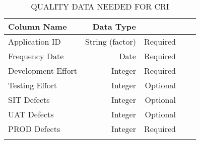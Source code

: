 \documentclass[SDSUThesis.tex]{subfiles}
\begin{document}
                \begin{longtable}{@{}l rr rr}
                    
                    \toprule%
                     \centering%
                     {\bfseries Column Name}
                     & {\bfseries Data Type}
                     &  \\
                    
                    \cmidrule[0.4pt](r{0.125em}){1-1}%
                    \cmidrule[0.4pt](lr{0.125em}){2-2}%
                    \cmidrule[0.4pt](l{0.125em}){3-3}%
                    \endhead
                    
                    Application ID & String (factor) & Required \\
                    \myrowcolour%
                    Frequency Date & Date & Required \\
                    Development Effort & Integer & Required \\
                    \myrowcolour%
                    Testing Effort & Integer & Optional \\ 
                    SIT Defects & Integer & Optional \\ 
                    \myrowcolour%
                    UAT Defects & Integer  & Optional \\ 
                    PROD Defects & Integer  & Required \\
                    
                    \bottomrule
                    
                    \caption{QUALITY DATA NEEDED FOR CRI}
                    \label{tab:qualitydata}
                \end{longtable}
                
\end{document}
